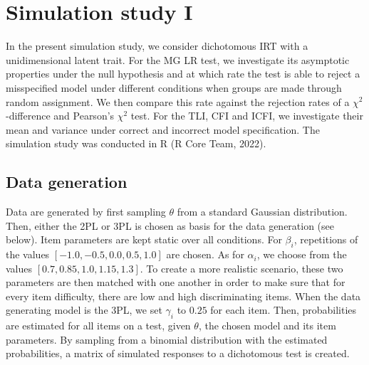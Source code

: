 \documentclass[Royal,sageapa,times,doublespace]{sagej}
\begin{document}
\section{Simulation study I}

In the present simulation study, we consider dichotomous IRT with a unidimensional latent trait. For the MG LR test, we investigate its asymptotic properties under the null hypothesis and at which rate the test is able to reject a misspecified model under different conditions when groups are made through random assignment. We then compare this rate against the rejection rates of a $\chi^2$-difference and Pearson's $\chi^2$ test. For the TLI, CFI and ICFI, we investigate their mean and variance under correct and incorrect model specification. The simulation study was conducted in R (R Core Team, 2022).
\subsection{Data generation}
Data are generated by first sampling $\theta$ from a standard Gaussian distribution. Then, either the 2PL or 3PL is chosen as basis for the data generation (see below). Item parameters are kept static over all conditions. For $\beta_i$, repetitions of the values $[-1.0, -0.5, 0.0, 0.5, 1.0]$ are chosen. As for $\alpha_i$, we choose from the values $[0.7, 0.85, 1.0, 1.15, 1.3]$. To create a more realistic scenario, these two parameters are then matched with one another in order to make sure that for every item difficulty, there are low and high discriminating items. When the data generating model is the 3PL, we set $\gamma_i$ to $0.25$ for each item. Then, probabilities are estimated for all items on a test, given $\theta$, the chosen model and its item parameters. By sampling from a binomial distribution with the estimated probabilities, a matrix of simulated responses to a dichotomous test is created.
\end{document}
